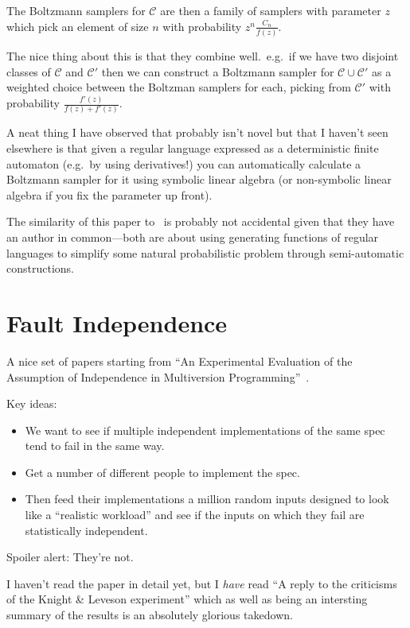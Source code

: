 \documentclass[a4paper]{book}
\begin{document}
The Boltzmann samplers for \(\mathcal{C}\) are then a family of samplers with parameter \(z\) which pick an element of size \(n\) with probability \(z^n \frac{C_n}{f(z)}\).

The nice thing about this is that they combine well.\ 
e.g.\ if we have two disjoint classes of \(\mathcal{C}\) and \(\mathcal{C}'\) then we can construct a Boltzmann sampler for \(\mathcal{C} \cup \mathcal{C}'\) as a weighted choice between the Boltzman samplers for each,
picking from \(\mathcal{C}'\) with probability \(\frac{f'(z)}{f(z) + f'(z)}\).

A neat thing I have observed\cite{falbs} that probably isn't novel but that I haven't seen elsewhere is that given a regular language expressed as a deterministic finite automaton
(e.g.\ by using derivatives!)
you can automatically calculate a Boltzmann sampler for it using symbolic linear algebra
(or non-symbolic linear algebra if you fix the parameter up front).

The similarity of this paper to~\cite{DBLP:journals/dam/FlajoletGT92} is probably not accidental given that they have an author in common---both
are about using generating functions of regular languages to simplify some natural probabilistic problem through semi-automatic constructions.

\section{Fault Independence}

A nice set of papers starting from ``An Experimental Evaluation of the Assumption of Independence in Multiversion Programming''~\cite{DBLP:journals/tse/KnightL86}.

Key ideas:

\begin{itemize}
\item We want to see if multiple independent implementations of the same spec tend to fail in the same way.
\item Get a number of different people to implement the spec.
\item Then feed their implementations a million random inputs designed to look like a ``realistic workload'' and see if the inputs on which they fail are statistically independent.
\end{itemize}

Spoiler alert: They're not.

I haven't read the paper in detail yet,
but I \emph{have} read ``A reply to the criticisms of the Knight \& Leveson experiment''\cite{knight1990reply} which as well as being an intersting summary of the results is an absolutely glorious takedown.
\end{document}
